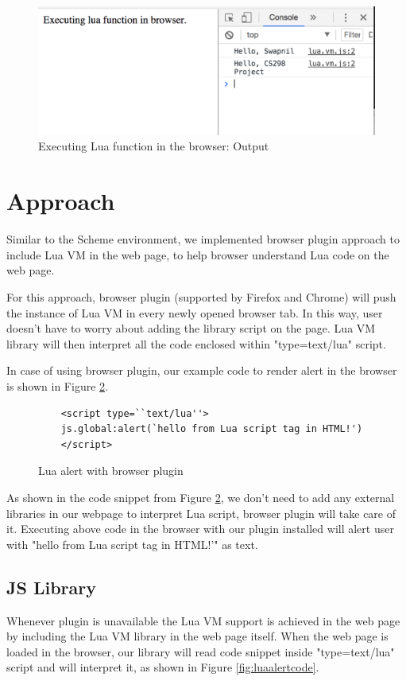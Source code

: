 \begin{figure}[H]
	\begin{center}
		\includegraphics[width=\linewidth]{./images/lua-functions.png}
	\end{center}
	\caption{Executing Lua function in the browser: Output}
	\label{fig:luafunction}
\end{figure}


\section{Approach}

Similar to the Scheme environment, we implemented browser plugin approach to include Lua VM in the web page, to help browser understand Lua code on the web page.

For this approach, browser plugin (supported by Firefox and Chrome) will push the instance of Lua VM in every newly opened browser tab. In this way, user doesn't have to worry about adding the library script on the page. Lua VM library will then interpret all the code enclosed within "type=text/lua" script.

In case of using browser plugin, our example code to render alert in the browser is shown in Figure \ref{fig:luaalertplugin}.

\begin{figure}[H]
	\begin{lstlisting}
	<script type=``text/lua''>
	js.global:alert(`hello from Lua script tag in HTML!') 
	</script>
	\end{lstlisting}
	\caption{Lua alert with browser plugin}
	\label{fig:luaalertplugin}
\end{figure}

As shown in the code snippet from Figure \ref{fig:luaalertplugin}, we don't need to add any external libraries in our webpage to interpret Lua script, browser plugin will take care of it.
Executing above code in the browser with our plugin installed will alert user with "hello from Lua script tag in HTML!'" as text.


\subsection{JS Library}

Whenever plugin is unavailable the Lua VM support is achieved in the web page by including the  Lua VM library in the web page itself. When the web page is loaded in the browser, our library will read code snippet inside "type=text/lua" script and will interpret it, as shown in Figure \ref{fig:luaalertcode}.
